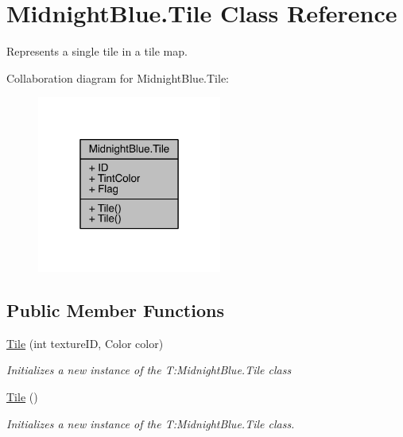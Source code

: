 \hypertarget{class_midnight_blue_1_1_tile}{}\section{Midnight\+Blue.\+Tile Class Reference}
\label{class_midnight_blue_1_1_tile}


Represents a single tile in a tile map.  




Collaboration diagram for Midnight\+Blue.\+Tile\+:
\nopagebreak
\begin{figure}[H]
\begin{center}
\leavevmode
\includegraphics[width=172pt]{class_midnight_blue_1_1_tile__coll__graph}
\end{center}
\end{figure}
\subsection*{Public Member Functions}
\begin{DoxyCompactItemize}
\item 
\hyperlink{class_midnight_blue_1_1_tile_a4e0e9f97acbb22eb1d54945b44d52e7b}{Tile} (int texture\+ID, Color color)
\begin{DoxyCompactList}\small\item\em Initializes a new instance of the T\+:\+Midnight\+Blue.\+Tile class \end{DoxyCompactList}\item 
\hyperlink{class_midnight_blue_1_1_tile_af89b11fc577df594ffebd0963e9020d4}{Tile} ()
\begin{DoxyCompactList}\small\item\em Initializes a new instance of the T\+:\+Midnight\+Blue.\+Tile class. \end{DoxyCompactList}\end{DoxyCompactItemize}
